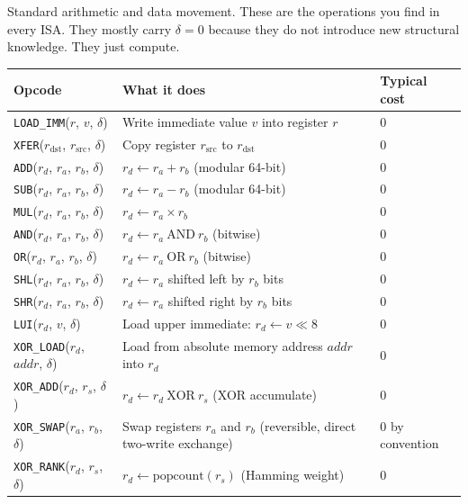 \documentclass[11pt,a4paper]{article}
\theoremstyle{plain}
\theoremstyle{definition}
\theoremstyle{remark}
\begin{document}
Standard arithmetic and data movement. These are the operations you find in every ISA. They mostly carry $\delta = 0$ because they do not introduce new structural knowledge. They just compute.

\begin{table}[!t]\centering
\begin{tabular}{p{}p{}p{}}
\toprule
Opcode & What it does & Typical cost \\
\midrule
\texttt{LOAD\_IMM}($r$, $v$, $\delta$) & Write immediate value $v$ into register $r$ & 0 \\
\texttt{XFER}($r_{\text{dst}}$, $r_{\text{src}}$, $\delta$) & Copy register $r_{\text{src}}$ to $r_{\text{dst}}$ & 0 \\
\texttt{ADD}($r_d$, $r_a$, $r_b$, $\delta$) & $r_d \leftarrow r_a + r_b$ (modular 64-bit) & 0 \\
\texttt{SUB}($r_d$, $r_a$, $r_b$, $\delta$) & $r_d \leftarrow r_a - r_b$ (modular 64-bit) & 0 \\
\texttt{MUL}($r_d$, $r_a$, $r_b$, $\delta$) & $r_d \leftarrow r_a \times r_b$ & 0 \\
\texttt{AND}($r_d$, $r_a$, $r_b$, $\delta$) & $r_d \leftarrow r_a\ \text{AND}\ r_b$ (bitwise) & 0 \\
\texttt{OR}($r_d$, $r_a$, $r_b$, $\delta$) & $r_d \leftarrow r_a\ \text{OR}\ r_b$ (bitwise) & 0 \\
\texttt{SHL}($r_d$, $r_a$, $r_b$, $\delta$) & $r_d \leftarrow r_a$ shifted left by $r_b$ bits & 0 \\
\texttt{SHR}($r_d$, $r_a$, $r_b$, $\delta$) & $r_d \leftarrow r_a$ shifted right by $r_b$ bits & 0 \\
\texttt{LUI}($r_d$, $v$, $\delta$) & Load upper immediate: $r_d \leftarrow v \ll 8$ & 0 \\
\texttt{XOR\_LOAD}($r_d$, $\mathit{addr}$, $\delta$) & Load from absolute memory address $\mathit{addr}$ into $r_d$ & 0 \\
\texttt{XOR\_ADD}($r_d$, $r_s$, $\delta$) & $r_d \leftarrow r_d\ \text{XOR}\ r_s$ (XOR accumulate) & 0 \\
\texttt{XOR\_SWAP}($r_a$, $r_b$, $\delta$) & Swap registers $r_a$ and $r_b$ (reversible, direct two-write exchange) & 0 by convention \\
\texttt{XOR\_RANK}($r_d$, $r_s$, $\delta$) & $r_d \leftarrow \text{popcount}(r_s)$ (Hamming weight) & 0 \\
\bottomrule
\end{tabular}
\end{table}
\end{document}
